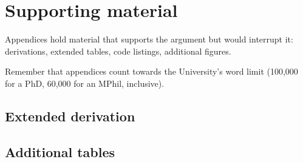 \chapter{Supporting material}
\label{app:material}

Appendices hold material that supports the argument but would interrupt it:
derivations, extended tables, code listings, additional figures.

Remember that appendices count towards the University's word limit
(100,000 for a PhD, 60,000 for an MPhil, inclusive).

\section{Extended derivation}

\section{Additional tables}
